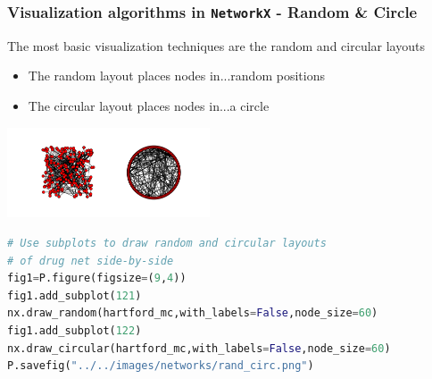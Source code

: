 \documentclass[xcolor=dvipsnames, 9pt]{beamer}
\begin{document}
\begin{frame}[fragile]
    \frametitle{Visualization algorithms in \texttt{NetworkX} - Random \& Circle}
    The most basic visualization techniques are the random and circular layouts
    \begin{itemize}
        \item The random layout places nodes in...random positions
        \item The circular layout places nodes in...a circle
    \end{itemize}
    \begin{center}
        \includegraphics[width=6cm,clip,trim=2cm 2cm 2cm 2cm]{../images/networks/rand_circ.png}
    \end{center}
    \begin{block}{}
        \scriptsize{\begin{lstlisting}[language=Python]
# Use subplots to draw random and circular layouts
# of drug net side-by-side
fig1=P.figure(figsize=(9,4))
fig1.add_subplot(121)
nx.draw_random(hartford_mc,with_labels=False,node_size=60)
fig1.add_subplot(122)
nx.draw_circular(hartford_mc,with_labels=False,node_size=60)
P.savefig("../../images/networks/rand_circ.png")
        \end{lstlisting}}
    \end{block}
\end{frame}
\end{document}
